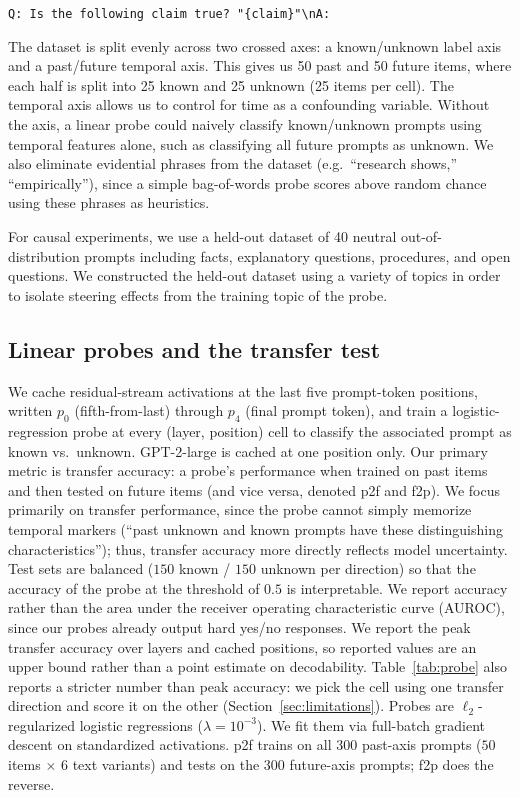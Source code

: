 \documentclass{article}
\begin{document}
\texttt{Q: Is the following claim true? "\{claim\}"\textbackslash nA:}

The dataset is split evenly across two crossed axes: a known/unknown label axis and a past/future temporal axis. This gives us 50 past and 50 future items, where each half is split into 25 known and 25 unknown (25 items per cell). The temporal axis allows us to control for time as a confounding variable. Without the axis, a linear probe could naively classify known/unknown prompts using temporal features alone, such as classifying all future prompts as unknown. We also eliminate evidential phrases from the dataset (e.g.\ ``research shows,'' ``empirically''), since a simple bag-of-words probe scores above random chance using these phrases as heuristics.

For causal experiments, we use a held-out dataset of 40 neutral out-of-distribution prompts including facts, explanatory questions, procedures, and open questions. We constructed the held-out dataset using a variety of topics in order to isolate steering effects from the training topic of the probe.

\subsection{Linear probes and the transfer test}

We cache residual-stream activations at the last five prompt-token positions, written $p_0$ (fifth-from-last) through $p_4$ (final prompt token), and train a logistic-regression probe at every (layer, position) cell to classify the associated prompt as known vs.\ unknown. GPT-2-large is cached at one position only. Our primary metric is transfer accuracy: a probe's performance when trained on past items and then tested on future items (and vice versa, denoted p2f and f2p). We focus primarily on transfer performance, since the probe cannot simply memorize temporal markers (``past unknown and known prompts have these distinguishing characteristics''); thus, transfer accuracy more directly reflects model uncertainty. Test sets are balanced ($150$ known / $150$ unknown per direction) so that the accuracy of the probe at the threshold of $0.5$ is interpretable. We report accuracy rather than the area under the receiver operating characteristic curve (AUROC), since our probes already output hard yes/no responses. We report the peak transfer accuracy over layers and cached positions, so reported values are an upper bound rather than a point estimate on decodability. Table~\ref{tab:probe} also reports a stricter number than peak accuracy: we pick the cell using one transfer direction and score it on the other (Section~\ref{sec:limitations}). Probes are $\ell_2$-regularized logistic regressions ($\lambda = 10^{-3}$). We fit them via full-batch gradient descent on standardized activations. p2f trains on all $300$ past-axis prompts ($50$ items $\times$ $6$ text variants) and tests on the $300$ future-axis prompts; f2p does the reverse.
\end{document}
